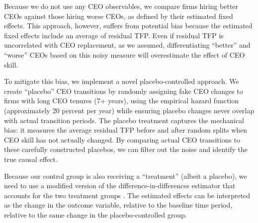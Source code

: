 Because we do not use any CEO observables, we compare firms hiring better CEOs against those hiring worse CEOs, as defined by their estimated fixed effects. This approach, however, suffers from potential bias because the estimated fixed effects include an average of residual TFP. Even if residual TFP is uncorrelated with CEO replacement, as we assumed, differentiating ``better'' and ``worse'' CEOs based on this noisy measure will overestimate the effect of CEO skill.

To mitigate this bias, we implement a novel placebo-controlled approach. We create ``placebo'' CEO transitions by randomly assigning fake CEO changes to firms with long CEO tenures (7+ years), using the empirical hazard function (approximately 20 percent per year) while ensuring placebo changes never overlap with actual transition periods. The placebo treatment captures the mechanical bias: it measures the average residual TFP before and after random splits when CEO skill has not actually changed. By comparing actual CEO transitions to these carefully constructed placebos, we can filter out the noise and identify the true causal effect. 

Because our control group is also receiving a ``treatment'' (albeit a placebo), we need to use a modified version of the difference-in-differences estimator \citep{Callaway2021JoLE} that accounts for the two treatment groups \citep{Koren2023expat,Koren2024xt2treatments}. The estimated effects can be interpreted as the change in the outcome variable, relative to the baseline time period, relative to the same change in the placebo-controlled group.
